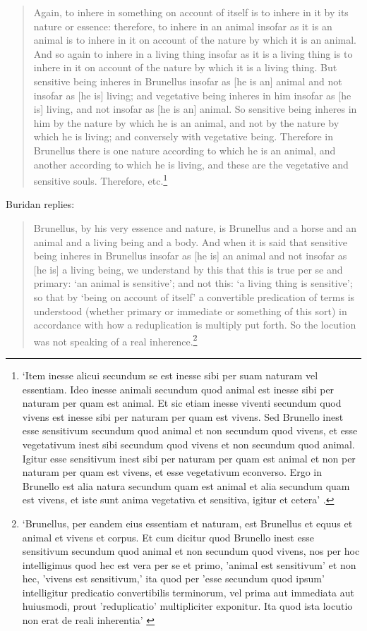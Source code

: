 \documentclass[]{article}
\begin{document}
	\begin{quote}
	Again, to inhere in something on account of itself is to inhere in it by its nature or essence: therefore, to inhere in an animal insofar as it is an animal is to inhere in it on account of the nature by which it is an animal. And so again to inhere in a living thing insofar as it is a living thing is to inhere in it on account of the nature by which it is a living thing. But sensitive being inheres in Brunellus insofar as [he is an] animal and not insofar as [he is] living; and vegetative being inheres in him insofar as [he is] living, and not insofar as [he is an] animal. So sensitive being inheres in him by the nature by which he is an animal, and not by the nature by which he is living; and conversely with vegetative being. Therefore in Brunellus there is one nature according to which he is an animal, and another according to which he is living, and these are the vegetative and sensitive souls. Therefore, etc.\footnote{`Item inesse alicui secundum se est inesse sibi per suam naturam vel essentiam. Ideo inesse animali secundum quod animal est inesse sibi per naturam per quam est animal. Et sic etiam inesse viventi secundum quod vivens est inesse sibi per naturam per quam est vivens. Sed Brunello inest esse sensitivum secundum quod animal et non secundum quod vivens, et esse vegetativum inest sibi secundum quod vivens et non secundum quod animal. Igitur esse sensitivum inest sibi per naturam per quam est animal et non per naturam per quam est vivens, et esse vegetativum econverso. Ergo in Brunello est alia natura secundum quam est animal et alia secundum quam est vivens, et iste sunt anima vegetativa et sensitiva, igitur et cetera' \autocite[II.4.3]{BuridanQDA}.}
	\end{quote} 
	
Buridan replies:

	\begin{quote}
	Brunellus, by his very essence and nature, is Brunellus and a horse and an animal and a living being and a body. And when it is said that sensitive being inheres in Brunellus insofar as [he is] an animal and not insofar as [he is] a living being, we understand by this that this is true per se and primary: `an animal is sensitive'; and not this: `a living thing is sensitive'; so that by `being on account of itself' a convertible predication of terms is understood (whether primary or immediate or something of this sort) in accordance with how a reduplication is multiply put forth. So the locution was not speaking of a real inherence.\footnote{`Brunellus, per eandem eius essentiam et naturam, est Brunellus et equus et animal et vivens et corpus. Et cum dicitur quod Brunello inest esse sensitivum secundum quod animal et non secundum quod vivens, nos per hoc intelligimus quod hec est vera per se et primo, 'animal est sensitivum' et non hec, 'vivens est sensitivum,' ita quod per 'esse secundum quod ipsum' intelligitur predicatio convertibilis terminorum, vel prima aut immediata aut huiusmodi, prout 'reduplicatio' multipliciter exponitur. Ita quod ista locutio non erat de reali inherentia' \autocite[II.4.22]{BuridanQDA}}
	\end{quote} 
	
\end{document}
